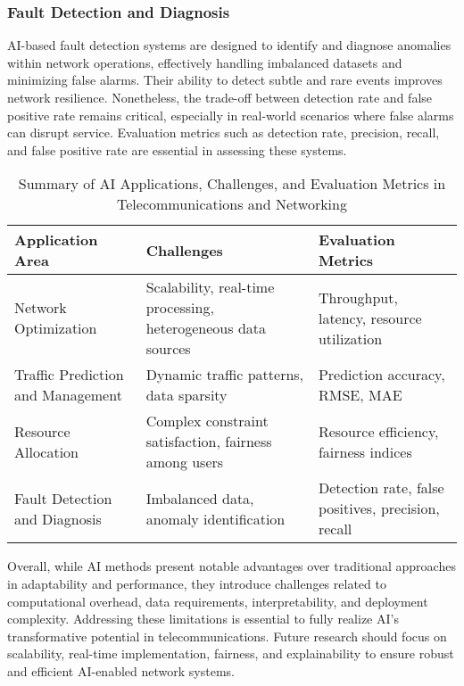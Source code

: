 \documentclass[sigconf]{acmart}
\begin{document}
\subsubsection{Fault Detection and Diagnosis}
AI-based fault detection systems are designed to identify and diagnose anomalies within network operations, effectively handling imbalanced datasets and minimizing false alarms. Their ability to detect subtle and rare events improves network resilience. Nonetheless, the trade-off between detection rate and false positive rate remains critical, especially in real-world scenarios where false alarms can disrupt service. Evaluation metrics such as detection rate, precision, recall, and false positive rate are essential in assessing these systems.

\begin{table*}[htbp]
\centering
\caption{Summary of AI Applications, Challenges, and Evaluation Metrics in Telecommunications and Networking}
\label{tab:ai_telecom_summary}
\begin{adjustbox}{max width=\textwidth}
\begin{tabular}{@{}lll@{}}
\toprule
\textbf{Application Area} & \textbf{Challenges} & \textbf{Evaluation Metrics} \\ \midrule
Network Optimization & Scalability, real-time processing, heterogeneous data sources & Throughput, latency, resource utilization \\
Traffic Prediction and Management & Dynamic traffic patterns, data sparsity & Prediction accuracy, RMSE, MAE \\
Resource Allocation & Complex constraint satisfaction, fairness among users & Resource efficiency, fairness indices \\
Fault Detection and Diagnosis & Imbalanced data, anomaly identification & Detection rate, false positives, precision, recall \\ \bottomrule
\end{tabular}
\end{adjustbox}
\end{table*}

Overall, while AI methods present notable advantages over traditional approaches in adaptability and performance, they introduce challenges related to computational overhead, data requirements, interpretability, and deployment complexity. Addressing these limitations is essential to fully realize AI's transformative potential in telecommunications. Future research should focus on scalability, real-time implementation, fairness, and explainability to ensure robust and efficient AI-enabled network systems.
\end{document}
